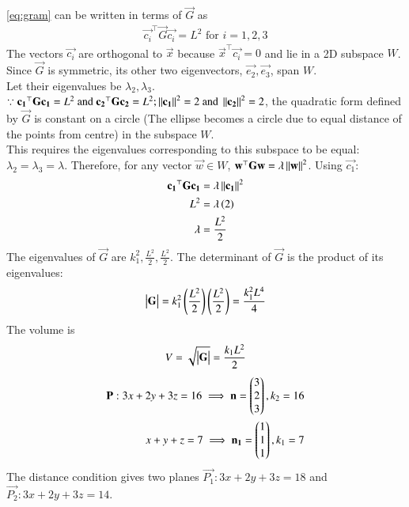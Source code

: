 \documentclass[xournal]{IEEEtran}
\begin{document}
\eqref{eq:gram} can be written in terms of $\vec{G}$ as
\begin{align}
    \vec{c_i}^\top \vec{G} \vec{c_i} = L^2 \text{ for } i=1,2,3
\end{align}
The vectors $\vec{c_i}$ are orthogonal to $\vec{x}$ because $\vec{x}^\top\vec{c_i}=0$ and lie in a 2D subspace $W$. \\
Since $\vec{G}$ is symmetric, its other two eigenvectors, $\vec{e_2}, \vec{e_3}$, span $W$. \\
Let their eigenvalues be $\lambda_2, \lambda_3$. \\
$\because \mathbf{c_1}^\top\mathbf{G}\mathbf{c_1} = L^2\text{ and }\mathbf{c_2}^\top\mathbf{G}\mathbf{c_2} = L^2; \left\lVert\mathbf{c_1}\right\rVert^2 = 2\text{ and }\left\lVert\mathbf{c_2}\right\rVert^2 = 2$, the quadratic form defined by $\vec{G}$ is constant on a circle (The ellipse becomes a circle due to equal distance of the points from centre) in the subspace $W$. \\
This requires the eigenvalues corresponding to this subspace to be equal: $\lambda_2 = \lambda_3 = \lambda$.
Therefore, for any vector $\vec{w} \in W$, $\mathbf{w}^\top\mathbf{G}\mathbf{w} = \lambda\left\lVert\mathbf{w}\right\rVert^2$.
Using $\vec{c_1}$:
\begin{align}
    \mathbf{c_1}^\top\mathbf{G}\mathbf{c_1} &= \lambda\left\lVert\mathbf{c_1}\right\rVert^2 \\
    L^2 &= \lambda\left(2\right) \\
    \lambda &= \frac{L^2}{2}
\end{align}
The eigenvalues of $\vec{G}$ are $k_1^2, \frac{L^2}{2}, \frac{L^2}{2}$. The determinant of $\vec{G}$ is the product of its eigenvalues:
\begin{align}
    \begin{vmatrix}\mathbf{G}\end{vmatrix} = k_1^2 \left(\frac{L^2}{2}\right) \left(\frac{L^2}{2}\right) = \frac{k_1^2 L^4}{4}
\end{align}
The volume is 
\begin{align}
    V = \sqrt{\begin{vmatrix}\mathbf{G}\end{vmatrix}} = \frac{k_1 L^2}{2}
\end{align}
\begin{align}
    \mathbf{P}: 3x+2y+3z=16 \implies \mathbf{n} = \begin{pmatrix}3 \\ 2 \\ 3\end{pmatrix}, k_2=16 \\
    x+y+z=7 \implies \mathbf{n_1} = \begin{pmatrix}1 \\ 1 \\ 1\end{pmatrix}, k_1=7 \\
\end{align}
The distance condition gives two planes $\vec{P_1}: 3x+2y+3z=18$ and $\vec{P_2}: 3x+2y+3z=14$. \\
\end{document}
